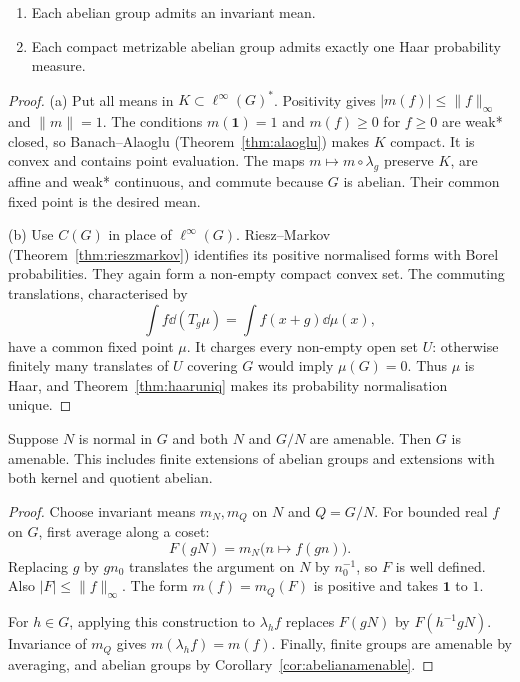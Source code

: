 \begin{corollary}\label{cor:abelianamenable}
\begin{enumerate}
\item[(a)] Each abelian group admits an invariant mean.
\item[(b)] Each compact metrizable abelian group admits exactly one Haar probability measure.
\end{enumerate}
\end{corollary}
\begin{proof}
(a) Put all means in $K\subset\ell^\infty(G)^*$. Positivity gives $|m(f)|\le\|f\|_\infty$ and $\|m\|=1$. The conditions $m(\mathbf1)=1$ and $m(f)\ge0$ for $f\ge0$ are weak* closed, so Banach--Alaoglu (Theorem~\ref{thm:alaoglu}) makes $K$ compact. It is convex and contains point evaluation. The maps $m\mapsto m\circ\lambda_g$ preserve $K$, are affine and weak* continuous, and commute because $G$ is abelian. Their common fixed point is the desired mean.

(b) Use $C(G)$ in place of $\ell^\infty(G)$. Riesz--Markov (Theorem~\ref{thm:rieszmarkov}) identifies its positive normalised forms with Borel probabilities. They again form a non-empty compact convex set. The commuting translations, characterised by
\[\int f\dd(T_g\mu)=\int f(x+g)\dd\mu(x),\]
have a common fixed point $\mu$. It charges every non-empty open set $U$: otherwise finitely many translates of $U$ covering $G$ would imply $\mu(G)=0$. Thus $\mu$ is Haar, and Theorem~\ref{thm:haaruniq} makes its probability normalisation unique.
\end{proof}

\begin{proposition}\label{prop:amenableext}
Suppose $N$ is normal in $G$ and both $N$ and $G/N$ are amenable. Then $G$ is amenable. This includes finite extensions of abelian groups and extensions with both kernel and quotient abelian.
\end{proposition}
\begin{proof}
Choose invariant means $m_N,m_Q$ on $N$ and $Q=G/N$. For bounded real $f$ on $G$, first average along a coset:
\[F(gN)=m_N\bigl(n\mapsto f(gn)\bigr).\]
Replacing $g$ by $gn_0$ translates the argument on $N$ by $n_0^{-1}$, so $F$ is well defined. Also $|F|\le\|f\|_\infty$. The form $m(f)=m_Q(F)$ is positive and takes $\mathbf1$ to $1$.

For $h\in G$, applying this construction to $\lambda_hf$ replaces $F(gN)$ by $F(h^{-1}gN)$. Invariance of $m_Q$ gives $m(\lambda_hf)=m(f)$. Finally, finite groups are amenable by averaging, and abelian groups by Corollary~\ref{cor:abelianamenable}.
\end{proof}

